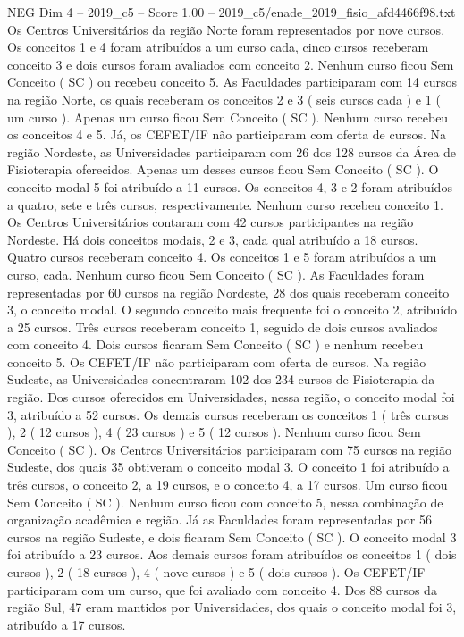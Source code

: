 \begin{textsample}{NEG Dim 4 – 2019\_c5 – Score 1.00 – 2019\_c5/enade\_2019\_fisio\_afd4466f98.txt}
Os Centros Universitários da região Norte foram representados por nove cursos.
Os conceitos 1 e 4 foram atribuídos a um curso cada, cinco cursos receberam conceito 3 e dois cursos foram avaliados com conceito 2.
Nenhum curso ficou Sem Conceito ( SC ) ou recebeu conceito 5.
As Faculdades participaram com 14 cursos na região Norte, os quais receberam os conceitos 2 e 3 ( seis cursos cada ) e 1 ( um curso ).
Apenas um curso ficou Sem Conceito ( SC ).
Nenhum curso recebeu os conceitos 4 e 5.
Já, os CEFET/IF não participaram com oferta de cursos.
Na região Nordeste, as Universidades participaram com 26 dos 128 cursos da Área de Fisioterapia oferecidos.
Apenas um desses cursos ficou Sem Conceito ( SC ).
O conceito modal 5 foi atribuído a 11 cursos.
Os conceitos 4, 3 e 2 foram atribuídos a quatro, sete e três cursos, respectivamente.
Nenhum curso recebeu conceito 1.
Os Centros Universitários contaram com 42 cursos participantes na região Nordeste.
Há dois conceitos modais, 2 e 3, cada qual atribuído a 18 cursos.
Quatro cursos receberam conceito 4.
Os conceitos 1 e 5 foram atribuídos a um curso, cada.
Nenhum curso ficou Sem Conceito ( SC ).
As Faculdades foram representadas por 60 cursos na região Nordeste, 28 dos quais receberam conceito 3, o conceito modal.
O segundo conceito mais frequente foi o conceito 2, atribuído a 25 cursos.
Três cursos receberam conceito 1, seguido de dois cursos avaliados com conceito 4.
Dois cursos ficaram Sem Conceito ( SC ) e nenhum recebeu conceito 5.
Os CEFET/IF não participaram com oferta de cursos.
Na região Sudeste, as Universidades concentraram 102 dos 234 cursos de Fisioterapia da região.
Dos cursos oferecidos em Universidades, nessa região, o conceito modal foi 3, atribuído a 52 cursos.
Os demais cursos receberam os conceitos 1 ( três cursos ), 2 ( 12 cursos ), 4 ( 23 cursos ) e 5 ( 12 cursos ).
Nenhum curso ficou Sem Conceito ( SC ).
Os Centros Universitários participaram com 75 cursos na região Sudeste, dos quais 35 obtiveram o conceito modal 3.
O conceito 1 foi atribuído a três cursos, o conceito 2, a 19 cursos, e o conceito 4, a 17 cursos.
Um curso ficou Sem Conceito ( SC ).
Nenhum curso ficou com conceito 5, nessa combinação de organização acadêmica e região.
Já as Faculdades foram representadas por 56 cursos na região Sudeste, e dois ficaram Sem Conceito ( SC ).
O conceito modal 3 foi atribuído a 23 cursos.
Aos demais cursos foram atribuídos os conceitos 1 ( dois cursos ), 2 ( 18 cursos ), 4 ( nove cursos ) e 5 ( dois cursos ).
Os CEFET/IF participaram com um curso, que foi avaliado com conceito 4.
Dos 88 cursos da região Sul, 47 eram mantidos por Universidades, dos quais o conceito modal foi 3, atribuído a 17 cursos.

\end{textsample}
